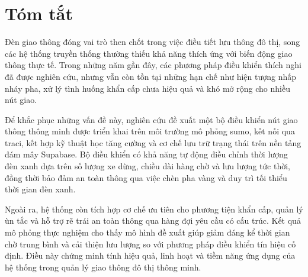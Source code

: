 \documentclass[12pt,a4paper,oneside]{report}
\begin{document}
\chapter*{Tóm tắt}
Đèn giao thông đóng vai trò then chốt trong việc điều tiết lưu thông đô thị, song các hệ thống truyền thống thường thiếu khả năng thích ứng với biến động giao thông thực tế. Trong những năm gần đây, các phương pháp điều khiển thích nghi đã được nghiên cứu, nhưng vẫn còn tồn tại những hạn chế như hiện tượng nhấp nháy pha, xử lý tình huống khẩn cấp chưa hiệu quả và khó mở rộng cho nhiều nút giao.

Để khắc phục những vấn đề này, nghiên cứu đề xuất một bộ điều khiển nút giao thông thông minh được triển khai trên môi trường mô phỏng \gls{sumo}, kết nối qua \gls{traci}, kết hợp kỹ thuật học tăng cường và cơ chế lưu trữ trạng thái trên nền tảng đám mây Supabase. Bộ điều khiển có khả năng tự động điều chỉnh thời lượng đèn xanh dựa trên số lượng xe dừng, chiều dài hàng chờ và lưu lượng tức thời, đồng thời bảo đảm an toàn thông qua việc chèn pha vàng và duy trì tối thiểu thời gian đèn xanh.

Ngoài ra, hệ thống còn tích hợp cơ chế ưu tiên cho phương tiện khẩn cấp, quản lý ùn tắc và hỗ trợ rẽ trái an toàn thông qua hàng đợi yêu cầu có cấu trúc. Kết quả mô phỏng thực nghiệm cho thấy mô hình đề xuất giúp giảm đáng kể thời gian chờ trung bình và cải thiện lưu lượng so với phương pháp điều khiển tín hiệu cố định. Điều này chứng minh tính hiệu quả, linh hoạt và tiềm năng ứng dụng của hệ thống trong quản lý giao thông đô thị thông minh.

\clearpage
{}










\end{document}
